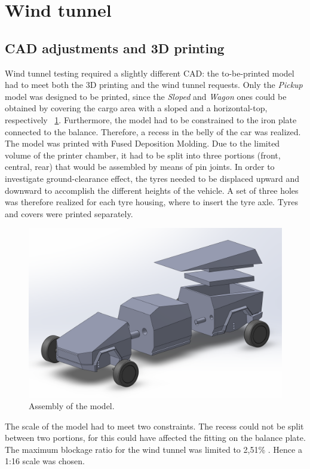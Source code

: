 \documentclass{elbioimp2}
\begin{document}
\section{Wind tunnel}
\subsection{CAD adjustments and 3D printing}
Wind tunnel testing required a slightly different CAD: the to-be-printed model had to meet both the 3D printing and the wind tunnel requests. 
Only the \emph{Pickup} model was designed to be printed, since the \emph{Sloped} and \emph{Wagon} ones could be obtained by covering the cargo area with a sloped and a horizontal-top, respectively  ~\ref{assembly}.
Furthermore, the model had to be constrained to the iron plate connected to the balance. Therefore, a recess in the belly of the car was realized.
The model was printed with Fused Deposition Molding. Due to the limited volume of the printer chamber, it had to be split into three portions (front, central, rear) that would be assembled by means of pin joints.
In order to investigate ground-clearance effect, the tyres needed to be displaced upward and downward to accomplish the different heights of the vehicle. A set of three holes was therefore realized for each tyre housing, where to insert the tyre axle. Tyres and covers were printed separately. 
\begin{figure}[htp]
  \centering
  \includegraphics[width=0.9\columnwidth]{assembly.png}
  \caption{Assembly of the model.\label{assembly}}
\end{figure}
The scale of the model had to meet two constraints. The recess could not be split between two portions, for this could have affected the fitting on the balance plate. The maximum blockage ratio for the wind tunnel was limited to 2,51\% \cite{Blockage}. Hence a 1:16 scale was chosen. 
\end{document}
